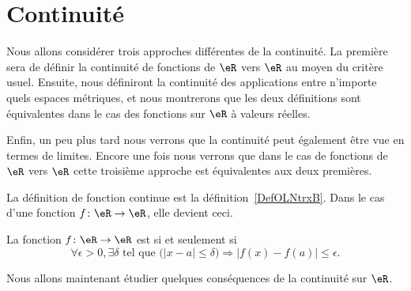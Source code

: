 \section{Continuité}

\begin{normaltext}
    Nous allons considérer trois approches différentes de la continuité. La première sera de définir la continuité de fonctions de $\eR$ vers $\eR$ au moyen du critère usuel. Ensuite, nous définiront la continuité des applications entre n'importe quels espaces métriques, et nous montrerons que les deux définitions sont équivalentes dans le cas des fonctions sur $\eR$ à valeurs réelles.

    Enfin, un peu plus tard nous verrons que la continuité peut également être vue en termes de limites. Encore une fois nous verrons que dans le cas de fonctions de $\eR$ vers $\eR$ cette troisième approche est équivalentes aux deux premières.
\end{normaltext}

La définition de fonction continue est la définition~\ref{DefOLNtrxB}. Dans le cas d'une fonction \( f\colon \eR\to \eR\), elle devient ceci.
\begin{proposition}      \label{PROPooVNGEooPwbxXP}
    La fonction \( f\colon \eR\to \eR\) est  si et seulement si
    \begin{equation}
        \forall \epsilon>0,\exists \delta\text{ tel que } \big(| x-a |\leq\delta\big)\Rightarrow | f(x)-f(a) |\leq \epsilon.
    \end{equation}
\end{proposition}

Nous allons maintenant étudier quelques conséquences de la continuité sur \( \eR\).

